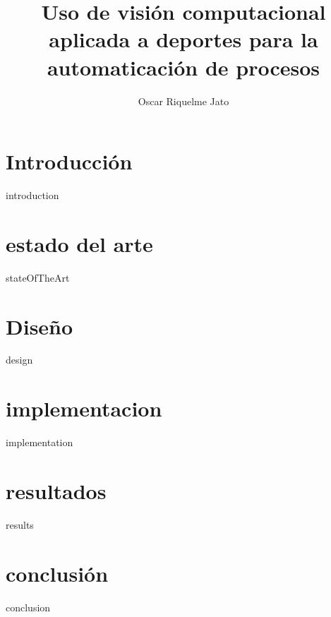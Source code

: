 \documentclass[epsbased,final,covers]{tfgtfmthesisuam}
\title[Visión computacional aplicada al deporte]{Uso de visión computacional aplicada a deportes para la automaticación de procesos}
\author{Oscar Riquelme Jato}
\begin{document}
\chapter[Introducción]{Introducción}{introduction}
\chapter[estado del arte]{estado del arte}{stateOfTheArt}
\chapter[diseño]{Diseño}{design}
\chapter[implementación]{implementacion}{implementation}
\chapter[resultados]{resultados}{results}
\chapter[conclusión]{conclusión}{conclusion}
\end{document}
